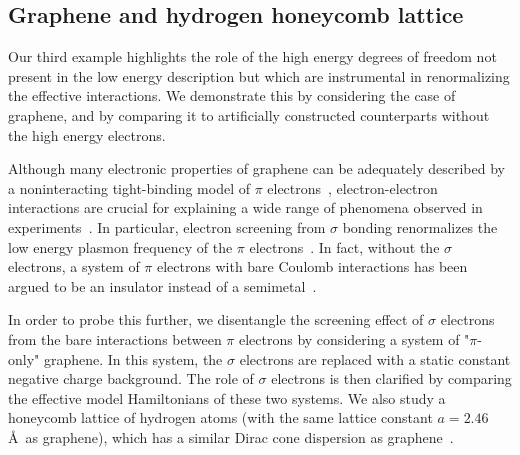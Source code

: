 \subsection{Graphene and hydrogen honeycomb lattice}
Our third example highlights the role of the high energy 
degrees of freedom not present in the low energy description 
but which are instrumental in renormalizing the effective interactions. 
We demonstrate this by considering the case of graphene, and by 
comparing it to artificially constructed counterparts without the high energy electrons. 

Although many electronic properties of graphene can be adequately 
described by a noninteracting tight-binding model of $\pi$ electrons~\cite{Castro2009}, 
electron-electron interactions are crucial for explaining 
a wide range of phenomena observed in experiments~\cite{Kotov2012}. 
In particular, electron screening from $\sigma$ bonding renormalizes 
the low energy plasmon frequency of the $\pi$ electrons~\cite{Zheng2016}. In fact, 
without the $\sigma$ electrons, a system of $\pi$ electrons with bare Coulomb interactions has been argued to be an 
insulator instead of a semimetal~\cite{DrutPRL2009, DrutPRB2009,  Smith2014, Zheng2016}. 

In order to probe this further, we disentangle the screening effect of $\sigma$ electrons from the bare interactions 
between $\pi$ electrons by considering a system of "$\pi$-only" graphene. In this system, the 
$\sigma$ electrons are replaced with a static constant negative charge background. 
The role of $\sigma$ electrons is then clarified by comparing the effective model Hamiltonians of these two systems. 
We also study a honeycomb lattice of hydrogen atoms (with the same lattice constant $a=2.46$\AA~as graphene), 
which has a similar Dirac cone dispersion as graphene~\cite{Zheng2016}. 

